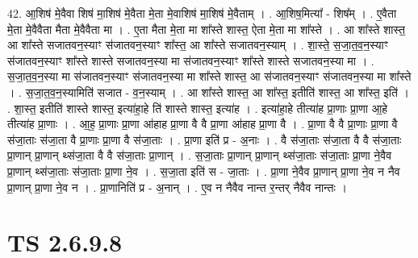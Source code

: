 \documentclass[17pt]{extarticle}
\begin{document}
42. आ॒शिष॑ मे॒वैवा शिष॑ मा॒शिष॑ मे॒वैता मे॒ता मे॒वाशिष॑ मा॒शिष॑ मे॒वैताम् । . आ॒शिष॒मित्या᳚ - शिष᳚म् । . ए॒वैता मे॒ता मे॒वैवैता मैता मे॒वैवैता मा । . ए॒ता मैता मे॒ता मा शा᳚स्ते शास्त॒ ऐता मे॒ता मा शा᳚स्ते । . आ शा᳚स्ते शास्त॒ आ शा᳚स्ते सजातवन॒स्याꣳ स॑जातवन॒स्याꣳ शा᳚स्त॒ आ शा᳚स्ते सजातवन॒स्याम् । . शा॒स्ते॒ स॒जा॒त॒व॒न॒स्याꣳ स॑जातवन॒स्याꣳ शा᳚स्ते शास्ते सजातवन॒स्या मा स॑जातवन॒स्याꣳ शा᳚स्ते शास्ते सजातवन॒स्या मा । . स॒जा॒त॒व॒न॒स्या मा स॑जातवन॒स्याꣳ स॑जातवन॒स्या मा शा᳚स्ते शास्त॒ आ स॑जातवन॒स्याꣳ स॑जातवन॒स्या मा शा᳚स्ते । . स॒जा॒त॒व॒न॒स्यामिति॑ सजात - व॒न॒स्याम् । . आ शा᳚स्ते शास्त॒ आ शा᳚स्त॒ इतीति॑ शास्त॒ आ शा᳚स्त॒ इति॑ । . शा॒स्त॒ इतीति॑ शास्ते शास्त॒ इत्या॑हा॒हे ति॑ शास्ते शास्त॒ इत्या॑ह । . इत्या॑हा॒हे तीत्या॑ह प्रा॒णाः प्रा॒णा आ॒हे तीत्या॑ह प्रा॒णाः । . आ॒ह॒ प्रा॒णाः प्रा॒णा आ॑हाह प्रा॒णा वै वै प्रा॒णा आ॑हाह प्रा॒णा वै । . प्रा॒णा वै वै प्रा॒णाः प्रा॒णा वै स॑जा॒ताः स॑जा॒ता वै प्रा॒णाः प्रा॒णा वै स॑जा॒ताः । . प्रा॒णा इति॑ प्र - अ॒नाः । . वै स॑जा॒ताः स॑जा॒ता वै वै स॑जा॒ताः प्रा॒णान् प्रा॒णान् थ्स॑जा॒ता वै वै स॑जा॒ताः प्रा॒णान् । . स॒जा॒ताः प्रा॒णान् प्रा॒णान् थ्स॑जा॒ताः स॑जा॒ताः प्रा॒णा ने॒वैव प्रा॒णान् थ्स॑जा॒ताः स॑जा॒ताः प्रा॒णा ने॒व । . स॒जा॒ता इति॑ स - जा॒ताः । . प्रा॒णा ने॒वैव प्रा॒णान् प्रा॒णा ने॒व न नैव प्रा॒णान् प्रा॒णा ने॒व न । . प्रा॒णानिति॑ प्र - अ॒नान् । . ए॒व न नैवैव नान्त र॒न्तर् नैवैव नान्तः । \newline
\pagebreak
{}
\section*{ TS 2.6.9.8 }
\end{document}
